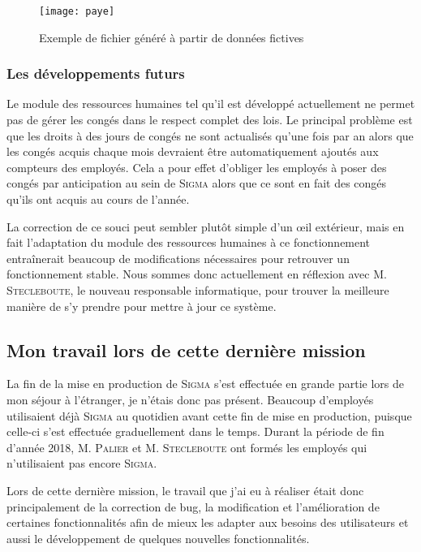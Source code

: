 \FloatBarrier
\begin{figure}[h!]
    \begin{center}
        \texttt{[image: paye]}
    \end{center}
    \caption{Exemple de fichier généré à partir de données fictives}
    \label{figure:paye}
\end{figure}
\FloatBarrier

\subsubsection{Les développements futurs}

Le module des ressources humaines tel qu'il est développé actuellement ne permet pas de gérer les congés dans le respect complet des lois.
Le principal problème est que les droits à des jours de congés ne sont actualisés qu'une fois par an alors que les congés acquis chaque mois devraient être automatiquement ajoutés aux compteurs des employés.
Cela a pour effet d'obliger les employés à poser des congés par anticipation au sein de \textsc{Sigma} alors que ce sont en fait des congés qu'ils ont acquis au cours de l'année.

La correction de ce souci peut sembler plutôt simple d'un œil extérieur, mais en fait l'adaptation du module des ressources humaines à ce fonctionnement entraînerait beaucoup de modifications nécessaires pour retrouver un fonctionnement stable.
Nous sommes donc actuellement en réflexion avec M. \textsc{Stecleboute}, le nouveau responsable informatique, pour trouver la meilleure manière de s'y prendre pour mettre à jour ce système.

\newpage
\subsection{Mon travail lors de cette dernière mission}

La fin de la mise en production de \textsc{Sigma} s'est effectuée en grande partie lors de mon séjour à l'étranger, je n'étais donc pas présent.
Beaucoup d'employés utilisaient déjà \textsc{Sigma} au quotidien avant cette fin de mise en production, puisque celle-ci s'est effectuée graduellement dans le temps.
Durant la période de fin d'année 2018, M. \textsc{Palier} et M. \textsc{Stecleboute} ont formés les employés qui n'utilisaient pas encore \textsc{Sigma}.

Lors de cette dernière mission, le travail que j'ai eu à réaliser était donc principalement de la correction de bug, la modification et l'amélioration de certaines fonctionnalités afin de mieux les adapter aux besoins des utilisateurs et aussi le développement de quelques nouvelles fonctionnalités.

